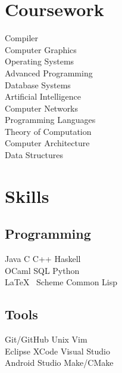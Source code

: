 \documentclass[]{deedy-resume-openfont}
\begin{document}
\begin{minipage}[t]{0.33\textwidth}

\section{Coursework}

Compiler \\
Computer Graphics \\
Operating Systems  \\
Advanced Programming \\
Database Systems \\
Artificial Intelligence \\
Computer Networks \\
Programming Languages \\
Theory of Computation \\
Computer Architecture \\
Data Structures \\
\sectionsep


\section{Skills}
\subsection{Programming}
Java    \textbullet{}   C    \textbullet{} C++ \textbullet{} Haskell \\
OCaml \textbullet{} SQL    \textbullet{} Python \\
\LaTeX\ \textbullet{} Scheme \textbullet{} Common Lisp \\
\sectionsep
\subsection{Tools}
Git/GitHub \textbullet{} Unix \textbullet{} Vim\\  Eclipse \textbullet{} XCode \textbullet{} Visual Studio\\
Android Studio \textbullet{} Make/CMake \\


\end{minipage}
\end{document}
